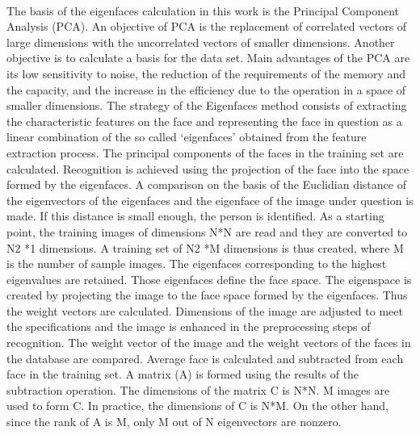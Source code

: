 \documentclass[a4paper, 12pt]{report}
\begin{document}
\paragraph{}
The basis of the eigenfaces calculation in this work is the Principal Component Analysis
(PCA).  An objective of PCA is the replacement of correlated vectors of
large dimensions with the uncorrelated vectors of smaller dimensions. Another objective is to
calculate a basis for the data set. Main advantages of the PCA are its low sensitivity to noise, the
reduction of the requirements of the memory and the capacity, and the increase in the efficiency
due to the operation in a space of smaller dimensions. The strategy of the Eigenfaces method
consists of extracting the characteristic features on the face and representing the face in question
as a linear combination of the so called ‘eigenfaces’ obtained from the feature extraction process.
The principal components of the faces in the training set are calculated. Recognition is achieved
using the projection of the face into the space formed by the eigenfaces. A comparison on the
basis of the Euclidian distance of the eigenvectors of the eigenfaces and the eigenface of the
image under question is made. If this distance is small enough, the person is identified.  As a starting point, the training images of
dimensions N*N are read and they are converted to N2 *1 dimensions. A training set of N2 *M
dimensions is thus created, where M is the number of sample images.
The eigenfaces corresponding to the highest eigenvalues are retained. Those eigenfaces
define the face space. The eigenspace is created by projecting the image to the face space
formed by the eigenfaces. Thus the weight vectors are calculated. Dimensions of the image
are adjusted to meet the specifications and the image is enhanced in the preprocessing steps of
recognition. The weight vector of the image and the weight vectors of the faces in the database
are compared. Average face is calculated and subtracted from each face in the training set. A
matrix (A) is formed using the results of the subtraction operation. The dimensions of the matrix
C is N*N. M images are used to form C. In practice, the dimensions of C is N*M. On the other
hand, since the rank of A is M, only M out of N eigenvectors are nonzero. 
\end{document}
